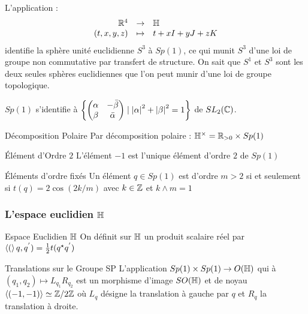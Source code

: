 \documentclass{cours}
\begin{document}
\begin{remark}
    L'application :
    \[
        \begin{array}[t]{rcl} \mathbb{R}^{4} & \to & \mathbb{H} \\ \left(t, x, y, z\right) & \mapsto & t + xI + yJ + zK \end{array}
    \]
    identifie la sphère unité euclidienne $S^{3}$ à $Sp(1)$, ce qui munit $S^{3}$ d'une loi de groupe non commutative par transfert de structure. On sait que $S^{1}$ et $S^{3}$ sont les deux seules sphères euclidiennes que l'on peut munir d'une loi de groupe topologique.
\end{remark}

\begin{remark}
    $Sp(1)$ s'identifie à $\left\{\begin{pmatrix}\alpha & -\bar{\beta} \\ \beta & \bar{\alpha}\end{pmatrix}\mid \left|\alpha\right|^{2} + \left|\beta\right|^{2} = 1\right\}$ de $SL_{2}(\mathbb{C})$.
\end{remark}

\begin{propositionfr}{Décomposition Polaire}{}
    Par décomposition polaire : $\mathbb{H}^{\times} = \mathbb{R}_{> 0} \times Sp(1)$
\end{propositionfr}

\begin{propositionfr}{Élément d'Ordre $2$}{}
    L'élément $-1$ est l'unique élément d'ordre $2$ de $Sp(1)$
\end{propositionfr}

\begin{propositionfr}{Éléments d'ordre fixés}{}
    Un élément $q \in Sp(1)$ est d'ordre $m > 2$ si et seulement si $t(q) = 2 \cos(2k / m)$ avec $k \in \mathbb{Z}$ et $k \wedge m = 1$
\end{propositionfr}

\subsubsection{L'espace euclidien $\mathbb{H}$}
\begin{définition}{Espace Euclidien $\mathbb{H}$}{}
    On définit sur $\mathbb{H}$ un produit scalaire réel par $\left\langle ( \right\rangle q, q^{'}) = \frac{1}{2}t(q^{\star}q^{'})$
\end{définition}

\begin{propositionfr}{Translations sur le Groupe SP}{}
    L'application $Sp(1) \times Sp(1) \to O(\mathbb{H})$ qui à $\left(q_{1}, q_{2}\right) \mapsto L_{q_{1}}R_{q_{2}}$ est un morphisme d'image $SO(\mathbb{H})$ et de noyau $\left\langle (-1, -1) \right\rangle \simeq \mathbb{Z}/2\mathbb{Z}$ où $L_{q}$ désigne la translation à gauche par $q$ et $R_{q}$ la translation à droite.
\end{propositionfr}
\end{document}
